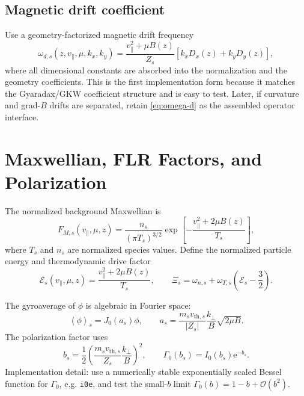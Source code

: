 \documentclass[11pt,a4paper]{article}
\newcommand{\ee}{\mathrm{e}}
\newcommand{\vpar}{v_{\parallel}}
\newcommand{\kperp}{k_{\perp}}
\newcommand{\avg}[1]{\left\langle #1 \right\rangle}
\newcommand{\Jzero}{J_0}
\newcommand{\Gzero}{\Gamma_0}
\begin{document}
\subsection{Magnetic drift coefficient}

Use a geometry-factorized magnetic drift frequency
\begin{equation}
  \omega_{d,s}(z,\vpar,\mu,k_x,k_y)
  =
  \frac{v_\parallel^2+\mu B(z)}{Z_s}
  \left[
    k_x D_x(z)+k_y D_y(z)
  \right],
  \label{eq:omega-d}
\end{equation}
where all dimensional constants are absorbed into the normalization and the geometry coefficients.  This is the first implementation form because it matches the Gyaradax/GKW coefficient structure and is easy to test.  Later, if curvature and grad-\(B\) drifts are separated, retain \eqref{eq:omega-d} as the assembled operator interface.

\section{Maxwellian, FLR Factors, and Polarization}

The normalized background Maxwellian is
\begin{equation}
  F_{M,s}(\vpar,\mu,z)
  =
  \frac{n_s}{(\pi T_s)^{3/2}}
  \exp\!\left[
    -\frac{\vpar^2+2\mu B(z)}{T_s}
  \right],
  \label{eq:maxwellian}
\end{equation}
where \(T_s\) and \(n_s\) are normalized species values.  Define the normalized particle energy and thermodynamic drive factor
\begin{equation}
  \mathcal{E}_s(\vpar,\mu,z)
  =
  \frac{\vpar^2+2\mu B(z)}{T_s},
  \qquad
  \Xi_s
  =
  \omega_{n,s}
  +
  \omega_{T,s}\left(\mathcal{E}_s-\frac{3}{2}\right).
  \label{eq:drive-factor}
\end{equation}

The gyroaverage of \(\phi\) is algebraic in Fourier space:
\begin{equation}
  \avg{\phi}_s
  =
  \Jzero(a_s)\phi,
  \qquad
  a_s
  =
  \frac{m_s v_{\mathrm{th},s}}{|Z_s|}
  \frac{\kperp}{B}
  \sqrt{2\mu B}.
  \label{eq:j0}
\end{equation}
The polarization factor uses
\begin{equation}
  b_s
  =
  \frac{1}{2}
  \left(
    \frac{m_s v_{\mathrm{th},s}}{Z_s}
    \frac{\kperp}{B}
  \right)^2,
  \qquad
  \Gzero(b_s) = I_0(b_s)\ee^{-b_s}.
  \label{eq:gamma0}
\end{equation}
Implementation detail: use a numerically stable exponentially scaled Bessel function for \(\Gzero\), e.g. \texttt{i0e}, and test the small-\(b\) limit \(\Gzero(b)=1-b+\mathcal{O}(b^2)\).
\end{document}
